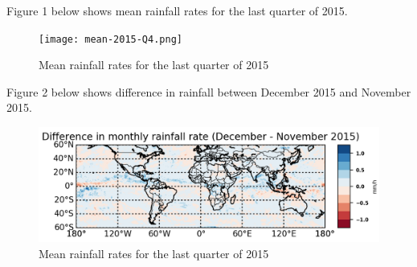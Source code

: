 \documentclass[12pt]{article}
\begin{document}
Figure 1 below shows mean rainfall rates for the last quarter of 2015.

\begin{figure}[h]
    \label{fig:meanQ42015}
\centering
\texttt{[image: mean-2015-Q4.png]}
\caption{Mean rainfall rates for the last quarter of 2015}
\end{figure}

Figure 2 below shows difference in rainfall between December 2015 and November 2015.

\begin{figure}[H]
    \label{fig:difference}
\begin{center}
   \includegraphics[width=1.25\linewidth]{diff-example.png}
\end{center}
\caption{Mean rainfall rates for the last quarter of 2015}
\end{figure}



\end{document}
